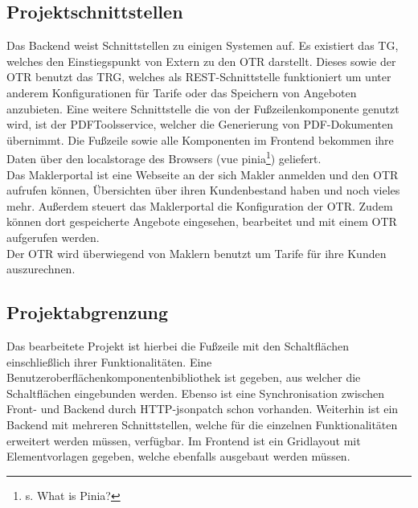 \subsection{Projektschnittstellen}
\label{projektschnittstellen}
Das Backend weist Schnittstellen zu einigen Systemen auf. Es existiert das \ac{TG}, welches den Einstiegspunkt von Extern zu den \ac{OTR} darstellt. Dieses sowie der \ac{OTR} benutzt das \ac{TRG}, welches als \gls{REST}-Schnittstelle funktioniert um unter anderem Konfigurationen für Tarife oder das Speichern von Angeboten anzubieten.
Eine weitere Schnittstelle die von der Fußzeilenkomponente genutzt wird, ist der PDFToolsservice, welcher die Generierung von PDF-Dokumenten übernimmt. Die Fußzeile sowie alle Komponenten im Frontend bekommen ihre Daten über den \gls{localstorage} des Browsers (\gls{vue} \gls{pinia}\footnote{s.\cite{Pinia2022} What is Pinia?}) geliefert.\\
Das Maklerportal ist eine Webseite an der sich Makler anmelden und den \ac{OTR} aufrufen können, Übersichten über ihren Kundenbestand haben und noch vieles mehr. Außerdem steuert das Maklerportal die Konfiguration der \ac{OTR}. Zudem können dort gespeicherte Angebote eingesehen, bearbeitet und mit einem \ac{OTR} aufgerufen werden.\\
Der \ac{OTR} wird überwiegend von Maklern benutzt um Tarife für ihre Kunden auszurechnen.


\subsection{Projektabgrenzung}
\label{projektabgrenzung}
Das bearbeitete Projekt ist hierbei die Fußzeile mit den Schaltflächen einschließlich ihrer Funktionalitäten. Eine Benutzeroberflächenkomponentenbibliothek ist gegeben, aus welcher die Schaltflächen eingebunden werden. Ebenso ist eine Synchronisation zwischen Front- und Backend durch \gls{HTTP}-\gls{jsonpatch} schon vorhanden. Weiterhin ist ein Backend mit mehreren Schnittstellen, welche für die einzelnen Funktionalitäten erweitert werden müssen, verfügbar. Im Frontend ist ein Gridlayout mit Elementvorlagen gegeben, welche ebenfalls ausgebaut werden müssen.